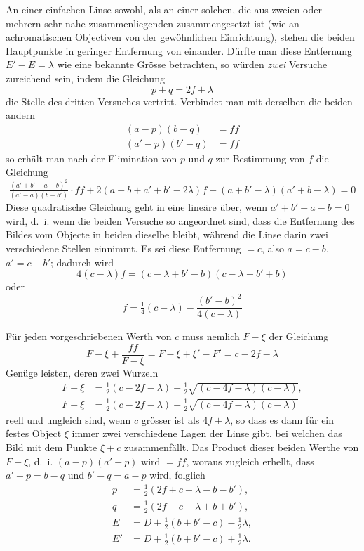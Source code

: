 \documentclass[11pt,a4paper]{article}
\begin{document}
\smallskip
An einer einfachen Linse sowohl, als an einer solchen, die aus zweien oder mehrern sehr nahe zusammenliegenden zusammengesetzt ist (wie an achromatischen Objectiven von der gewöhnlichen Einrichtung), stehen die beiden Hauptpunkte in geringer Entfernung von einander. Dürfte man diese Entfernung $E' - E = \lambda$ wie eine bekannte Grösse betrachten, so würden \textit{zwei} Versuche zureichend sein, indem die Gleichung
\[
p + q = 2f + \lambda
\]
die Stelle des dritten Versuches vertritt. Verbindet man mit derselben die beiden andern
\begin{align*}
(a - p)(b - q) &= ff \\
(a' - p)(b' - q) &= ff
\end{align*}
so erhält man nach der Elimination von $p$ und $q$ zur Bestimmung von $f$ die Gleichung
\[
\tfrac{(a' + b' - a - b)^2}{(a' - a)(b - b')} \cdot ff + 2(a + b + a' + b' - 2\lambda)f - (a + b' - \lambda)(a' + b - \lambda) = 0
\]
Diese quadratische Gleichung geht in eine lineäre über, wenn $a' + b' - a - b = 0$ wird, d.~i. wenn die beiden Versuche so angeordnet sind, dass die Entfernung des Bildes vom Objecte in beiden dieselbe bleibt, während die Linse darin zwei verschiedene Stellen einnimmt. Es sei diese Entfernung $= c$, also $a = c - b$, $a' = c - b'$; dadurch wird
\[
4(c - \lambda)f = (c - \lambda + b' - b)(c - \lambda - b' + b)
\]
oder
\[
f = \tfrac14(c - \lambda) - \frac{(b' - b)^2}{4(c - \lambda)}
\]

\newpage
\noindent
Für jeden vorgeschriebenen Werth von $c$ muss nemlich $F - \xi$ der Gleichung
\[
F - \xi + \frac{ff}{F - \xi} = F - \xi + \xi' - F' = c - 2f - \lambda
\]
Genüge leisten, deren zwei Wurzeln
\begin{align*}
F - \xi &= \tfrac12(c - 2f - \lambda) + \tfrac12\sqrt{(c - 4f - \lambda)(c - \lambda)}, \\
F - \xi &= \tfrac12(c - 2f - \lambda) - \tfrac12\sqrt{(c - 4f - \lambda)(c - \lambda)}
\end{align*}
reell und ungleich sind, wenn $c$ grösser ist als $4f + \lambda$, so dass es dann für ein festes Object $\xi$ immer zwei verschiedene Lagen der Linse gibt, bei welchen das Bild mit dem Punkte $\xi + c$ zusammenfällt. Das Product dieser beiden Werthe von $F - \xi$, d.~i. $(a - p)(a' - p)$ wird $= ff$, woraus zugleich erhellt, dass $a' - p = b - q$ und $b' - q = a - p$ wird, folglich
\begin{align*}
p &= \tfrac12(2f + c + \lambda - b - b'), \\
q &= \tfrac12(2f - c + \lambda + b + b'), \\
E &= D + \tfrac12(b + b' - c) - \tfrac12\lambda, \\
E' &= D + \tfrac12(b + b' - c) + \tfrac12\lambda.
\end{align*}
\end{document}
